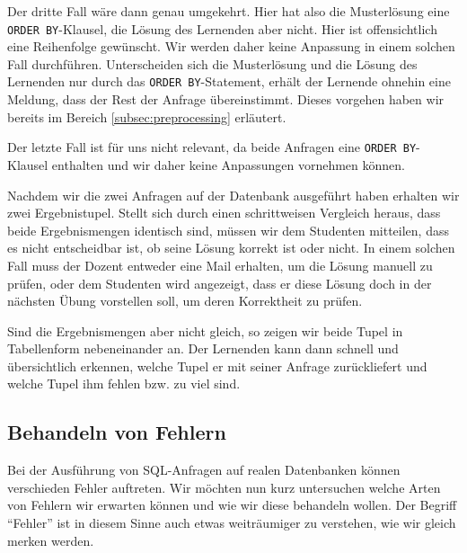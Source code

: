 Der dritte Fall wäre dann genau umgekehrt. Hier hat also die Musterlösung eine \verb|ORDER BY|-Klausel, die Lösung des Lernenden aber nicht. Hier ist offensichtlich eine Reihenfolge gewünscht. Wir werden daher keine Anpassung in einem solchen Fall durchführen. Unterscheiden sich die Musterlösung und die Lösung des Lernenden nur durch das \verb|ORDER BY|-Statement, erhält der Lernende ohnehin eine Meldung, dass der Rest der Anfrage übereinstimmt. Dieses vorgehen haben wir bereits im Bereich \ref{subsec:preprocessing} erläutert.

Der letzte Fall ist für uns nicht relevant, da beide Anfragen eine \verb|ORDER BY|-Klausel enthalten und wir daher keine Anpassungen vornehmen können. 

Nachdem wir die zwei Anfragen auf der Datenbank ausgeführt haben erhalten wir zwei Ergebnistupel. Stellt sich durch einen schrittweisen Vergleich heraus, dass beide Ergebnismengen identisch sind, müssen wir dem Studenten mitteilen, dass es nicht entscheidbar ist, ob seine Lösung korrekt ist oder nicht. In einem solchen Fall muss der Dozent entweder eine Mail erhalten, um die Lösung manuell zu prüfen, oder dem Studenten wird angezeigt, dass er diese Lösung doch in der nächsten Übung vorstellen soll, um deren Korrektheit zu prüfen.

Sind die Ergebnismengen aber nicht gleich, so zeigen wir beide Tupel in Tabellenform nebeneinander an. Der Lernenden kann dann schnell und übersichtlich erkennen, welche Tupel er mit seiner Anfrage zurückliefert und welche Tupel ihm fehlen bzw. zu viel sind.

\subsection{Behandeln von Fehlern}

Bei der Ausführung von SQL-Anfragen auf realen Datenbanken können verschieden Fehler auftreten. Wir möchten nun kurz untersuchen welche Arten von Fehlern wir erwarten können und wie wir diese behandeln wollen. Der Begriff "`Fehler"' ist in diesem Sinne auch etwas weiträumiger zu verstehen, wie wir gleich merken werden.

